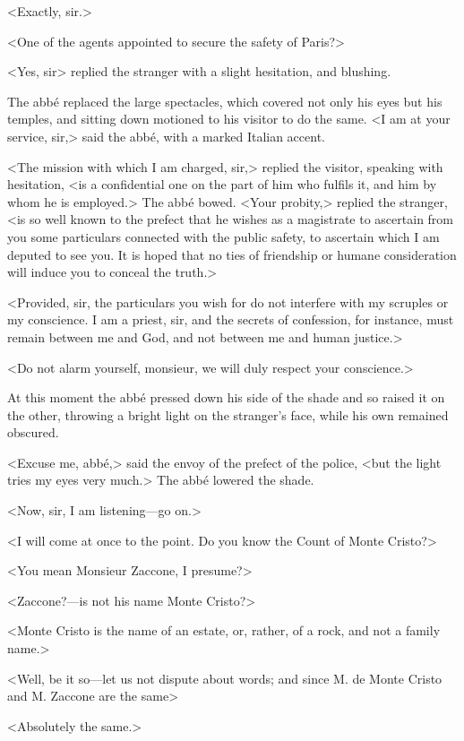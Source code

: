  <Exactly, sir.> 

 <One of the agents appointed to secure the safety of Paris?> 

 <Yes, sir> replied the stranger with a slight hesitation, and blushing. 

 The abbé replaced the large spectacles, which covered not only his eyes but his temples, and sitting down motioned to his visitor to do the same. <I am at your service, sir,> said the abbé, with a marked Italian accent. 

 <The mission with which I am charged, sir,> replied the visitor, speaking with hesitation, <is a confidential one on the part of him who fulfils it, and him by whom he is employed.> The abbé bowed. <Your probity,> replied the stranger, <is so well known to the prefect that he wishes as a magistrate to ascertain from you some particulars connected with the public safety, to ascertain which I am deputed to see you. It is hoped that no ties of friendship or humane consideration will induce you to conceal the truth.> 

 <Provided, sir, the particulars you wish for do not interfere with my scruples or my conscience. I am a priest, sir, and the secrets of confession, for instance, must remain between me and God, and not between me and human justice.> 

 <Do not alarm yourself, monsieur, we will duly respect your conscience.> 

 At this moment the abbé pressed down his side of the shade and so raised it on the other, throwing a bright light on the stranger's face, while his own remained obscured. 

 <Excuse me, abbé,> said the envoy of the prefect of the police, <but the light tries my eyes very much.> The abbé lowered the shade. 

 <Now, sir, I am listening—go on.> 

 <I will come at once to the point. Do you know the Count of Monte Cristo?> 

 <You mean Monsieur Zaccone, I presume?> 

 <Zaccone?—is not his name Monte Cristo?> 

 <Monte Cristo is the name of an estate, or, rather, of a rock, and not a family name.> 

 <Well, be it so—let us not dispute about words; and since M. de Monte Cristo and M. Zaccone are the same\longdash> 

 <Absolutely the same.> 

